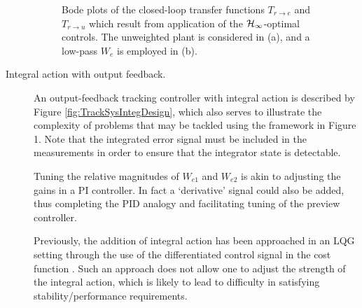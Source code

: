 \begin{description}
\begin{figure}
\caption{Bode plots of the closed-loop transfer functions $T_{r\rightarrow e}$ and $T_{r\rightarrow u}$ which result from application of the $\mathcal H_\infty$-optimal controls.\label{fig:sigmah2} The unweighted plant is considered in (a), and a low-pass $W_e$ is employed in (b).}
\end{figure}
\item[Integral action with output feedback.]
An output-feedback tracking controller with integral action is described by Figure \ref{fig:TrackSysIntegDesign}, which also serves to
illustrate the complexity of problems that may be tackled  using the framework in Figure 1. Note that the integrated error signal must be included in the measurements in order to ensure that the integrator state is detectable. 

Tuning the relative magnitudes of $W_{e1}$ and $W_{e2}$ is akin to adjusting the gains in a PI controller. %
In fact a `derivative' signal could also be added, thus completing the PID analogy and facilitating tuning of the preview controller. 

Previously, the addition of integral action has been approached in an {LQG} setting through the use of the differentiated control signal in the cost function \citep[e.g. ][]{Tomizuka_1979_IntegralPreviewFI,Katayama_1987_PreviewAndIntegral,Tomi_1980_FFPrev}. Such an approach does not allow one to adjust the strength of the integral action, which is likely to lead to difficulty in satisfying stability/performance requirements. 



\end{description}
